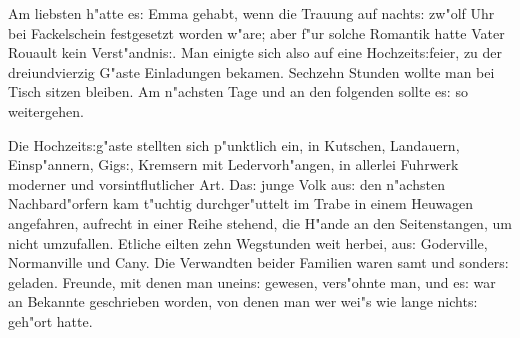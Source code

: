 \documentclass[oneside,12pt]{book}
\newcommand{\s}{s:}%
\begin{document}
Am liebsten h"atte e{\s} Emma gehabt, wenn die Trauung auf
nacht{\s} zw"olf Uhr bei Fackelschein festgesetzt worden w"are;
aber f"ur solche Romantik hatte Vater Rouault kein Verst"andni{\s}.
Man einigte sich also auf eine Hochzeit{\s}feier, zu der
dreiundvierzig G"aste Einladungen bekamen. Sechzehn Stunden wollte
man bei Tisch sitzen bleiben. Am n"achsten Tage und an den
folgenden sollte e{\s} so weitergehen.



\newpage\begin{center}
{\large \so{Vierte{\s} Kapitel}}\bigskip\bigskip
\end{center}

Die Hochzeit{\s}g"aste stellten sich p"unktlich ein, in Kutschen,
Landauern, Einsp"annern, Gig{\s}, Kremsern mit Ledervorh"angen, in
allerlei Fuhrwerk moderner und vorsintflutlicher Art. Da{\s} junge
Volk au{\s} den n"achsten Nachbard"orfern kam t"uchtig
durchger"uttelt im Trabe in einem Heuwagen angefahren, aufrecht in
einer Reihe stehend, die H"ande an den Seitenstangen, um nicht
umzufallen. Etliche eilten zehn Wegstunden weit herbei, au{\s}
Goderville, Normanville und Cany. Die Verwandten beider Familien
waren samt und sonder{\s} geladen. Freunde, mit denen man
unein{\s} gewesen, vers"ohnte man, und e{\s} war an Bekannte
geschrieben worden, von denen man wer wei"s wie lange nicht{\s}
geh"ort hatte.
\end{document}
